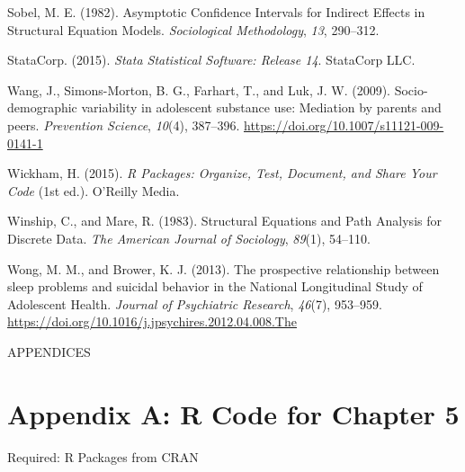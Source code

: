 \documentclass[]{DissertateUSU}
\begin{document}
\hypertarget{ref-Sobel1982}{}
Sobel, M. E. (1982). Asymptotic Confidence Intervals for Indirect
Effects in Structural Equation Models. \emph{Sociological Methodology},
\emph{13}, 290--312.

\hypertarget{ref-Stata14}{}
StataCorp. (2015). \emph{Stata Statistical Software: Release 14}.
StataCorp LLC.

\hypertarget{ref-Wang2009}{}
Wang, J., Simons-Morton, B. G., Farhart, T., and Luk, J. W. (2009).
Socio-demographic variability in adolescent substance use: Mediation by
parents and peers. \emph{Prevention Science}, \emph{10}(4), 387--396.
\url{https://doi.org/10.1007/s11121-009-0141-1}

\hypertarget{ref-Wickham2015}{}
Wickham, H. (2015). \emph{R Packages: Organize, Test, Document, and
Share Your Code} (1st ed.). O'Reilly Media.

\hypertarget{ref-Winship1983}{}
Winship, C., and Mare, R. (1983). Structural Equations and Path Analysis
for Discrete Data. \emph{The American Journal of Sociology},
\emph{89}(1), 54--110.

\hypertarget{ref-Wong2013}{}
Wong, M. M., and Brower, K. J. (2013). The prospective relationship
between sleep problems and suicidal behavior in the National
Longitudinal Study of Adolescent Health. \emph{Journal of Psychiatric
Research}, \emph{46}(7), 953--959.
\url{https://doi.org/10.1016/j.jpsychires.2012.04.008.The}

\clearpage
{} 
\fancyhead[R]{\thepage} \fancyfoot[C]{}

\vspace*{\fill}

\begin{center}
    APPENDICES 
  \end{center}

\vspace*{\fill}

\clearpage

\doublespacing

\section*{Appendix A: R Code for Chapter
5}\label{appendix-a-r-code-for-chapter-5}

\singlespace

Required: R Packages from CRAN

\small
\end{document}
